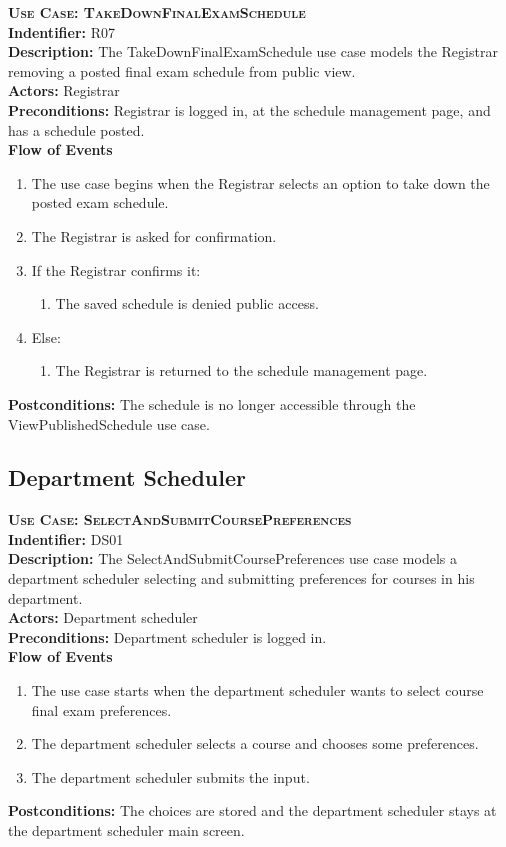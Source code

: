 \documentclass[11pt]{article}
\newenvironment{usecase}{%
	\def\title##1{ {\large \bfseries  \scshape {Use Case:} ##1} \\ }
 	\def\id##1{{\bf Indentifier:} ##1\\}
	\def\des##1{ {\bf Description:} ##1\\}
	\def\actors##1{ {\bf Actors:} ##1\\}
    	\def\pre##1{ {\bf Preconditions:} ##1 \\} %
    	\def\flow##1{ {\bf Flow of Events} ##1}%
    	\newenvironment{ucenum}{%
        	\begin{enumerate}[nolistsep]\small}%
        	{\end{enumerate}}
	\def\post##1{ {\bf Postconditions:} ##1 \\}
}{\vspace{.05in}}
\begin{document}
\begin{usecase}
  \title{TakeDownFinalExamSchedule}
  \id{R07}
  \des{The TakeDownFinalExamSchedule use case models the Registrar removing a posted final exam schedule from public view.}
  \actors{Registrar}
  \pre{Registrar is logged in, at the schedule management page, and has a schedule posted.}
  \flow{}
  \begin{ucenum}
  \item The use case begins when the Registrar selects an option to take down the posted exam schedule.
  \item The Registrar is asked for confirmation.
  \item If the Registrar confirms it:
    \begin{ucenum} \item The saved schedule is denied public access. \end{ucenum}
  \item Else:
    \begin{ucenum} \item The Registrar is returned to the schedule management page. \end{ucenum}
  \end{ucenum}
  \post{The schedule is no longer accessible through the ViewPublishedSchedule use case.}
\end{usecase}

\subsection{Department Scheduler}
\begin{usecase}
  \title{SelectAndSubmitCoursePreferences}
  \id{DS01}
  \des{The SelectAndSubmitCoursePreferences use case models a department scheduler selecting and submitting preferences for courses in his department.}
  \actors{Department scheduler}
  \pre{Department scheduler is logged in.}
  \flow{}
  \begin{ucenum}
  \item The use case starts when the department scheduler wants to select course final exam preferences.
  \item The department scheduler selects a course and chooses some preferences.
  \item The department scheduler submits the input.
  \end{ucenum}
  \post{The choices are stored and the department scheduler stays at the department scheduler main screen.}
\end{usecase}
\end{document}
